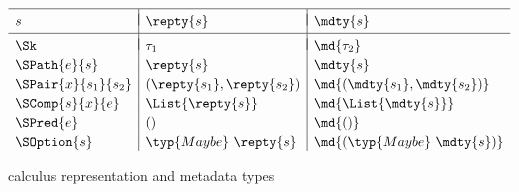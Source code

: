 \begin{figure}
\[
\begin{array}{l|l|l}
\hline
& & \\[-.85em]
s & \repty{s} & \mdty{s} \\[.5ex]
\hline
& & \\[-.85em]
\Sk & \tau_1 &  \md{\tau_2} \\[.5ex]
\SPath{e}{s} & \repty{s} & \mdty{s} \\[.5ex]
\SPair{x}{s_1}{s_2} & (\repty{s_1}, \repty{s_2}) & \md{(\mdty{s_1}, \mdty{s_2})} \\[.5ex]
\SComp{s}{x}{e} & \List{\repty{s}} & \md{\List{\mdty{s}}}\\[.5ex]
\SPred{e} & () & \md{()}\\[.5ex]
\SOption{s} & \typ{Maybe}~\repty{s} & \md{(\typ{Maybe}~\mdty{s})} 
\end{array}
\]
\caption{\forest{} calculus representation and metadata types}
\label{fig:ctypes}
\end{figure}

